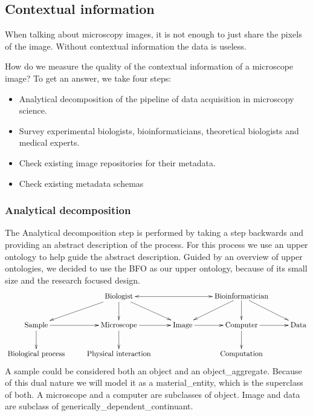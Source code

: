 \subsection{Contextual information}

When talking about microscopy images, it is
not enough to just share the pixels of the
image. Without contextual
information the data is useless.

How do we measure the quality of the contextual information of a
microscope image? To get an answer, we take four steps:
\begin{itemize}
\item Analytical decomposition of the
  pipeline of data acquisition
  in microscopy science.
\item Survey experimental biologists, bioinformaticians, theoretical
  biologists and medical experts.
\item Check existing image repositories for
  their metadata.
\item Check existing metadata schemas
\end{itemize}

\subsubsection{Analytical decomposition}

The Analytical decomposition
step is performed by taking a
step backwards and providing an abstract description of the
process. For this process we use an upper
ontology
to help guide the abstract description. Guided by an overview of upper
ontologies\cite{mascardi2007comparison}, we decided to use the
BFO\cite{grenon2004biodynamic} as our upper ontology, because of its
small size and the research focused design.
\begin{displaymath}
  \xymatrix{ & \text{Biologist} \ar[dl] \ar[d] \ar[dr] \ar@{<->}[rr] &
    & \text{Bioinformatician} \ar[dl] \ar[d] \ar[dr] &
    \\ \text{Sample} \ar[d] \ar[r] & \text{Microscope} \ar[d] \ar[r] &
    \text{Image} \ar[r] & \text{Computer} \ar[d] \ar[r] & \text{Data}
    \\ \text{Biological process} & \text{Physical interaction} & &
    \text{Computation} & }
\end{displaymath}
A sample could be considered both an
object and an
object\_aggregate. Because of this dual nature
we will model it as a material\_entity, which
is the superclass of both. A microscope and a
computer are subclasses of
object. Image and data are
subclass of
generically\_dependent\_continuant.

